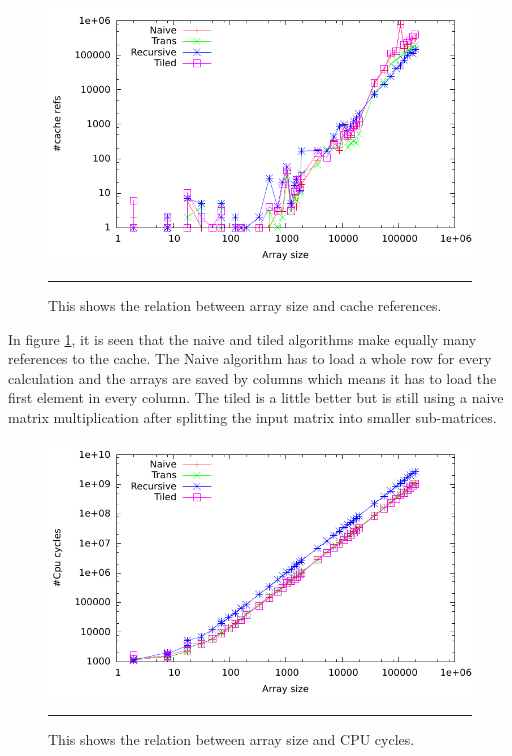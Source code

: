 \begin{figure}[htbp]
	\centering
		\includegraphics[width=\textwidth]{./Figures/Project2a/Cache_refs.pdf}
		\rule{35em}{0.5pt}
	\caption[Cache refs]{
	This shows the relation between array size and cache references.
	}
	\label{fig:Cache_refs_p2a}
\end{figure}
In figure \ref{fig:Cache_refs_p2a}, it is seen that the naive and tiled algorithms make equally many references to the cache.
The Naive algorithm has to load a whole row for every calculation and the arrays are saved by columns which means it has to load the first element in every column.
The tiled is a little better but is still using a naive matrix multiplication after splitting the input matrix into smaller sub-matrices.

\begin{figure}[htbp]
	\centering
		\includegraphics[width=\textwidth]{./Figures/Project2a/Cpu_cycles.pdf}
		\rule{35em}{0.5pt}
	\caption[CPU cycles]{
	This shows the relation between array size and CPU cycles.
	}
	\label{fig:Cpu_cycles_p2a}
\end{figure}

